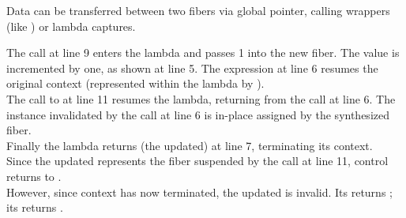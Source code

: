 
Data can be transferred between two fibers via global pointer, calling
wrappers (like ) or lambda captures.

The \resume call at line 9 enters the lambda and passes 1 into the
new fiber. The value is incremented by one, as shown at line 5. The expression
 at line 6 resumes the original context (represented
within the lambda by ).\\
The call to  at line 11 resumes the lambda, returning from
the  call at line 6. The \fiber instance 
invalidated by the \resume call at line 6 is in-place assigned by the
synthesized fiber.\\
Finally the lambda returns (the updated)  at line 7, terminating its
context.\\

Since the updated  represents the fiber suspended by the call at
line 11, control returns to \main.\\

However, since context  has now terminated, the updated 
is invalid. Its \opbool returns ; its  returns
.\\

